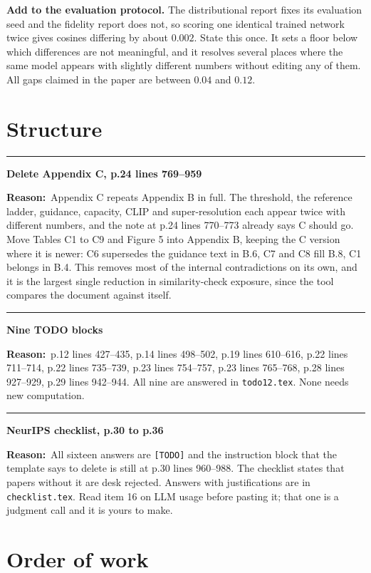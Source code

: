 \documentclass[11pt]{article}
\newcommand{\NEW}[1]{\medskip\noindent\textcolor{hd}{\rule{\textwidth}{0.6pt}}\par
  \noindent\textbf{#1}\par\smallskip}
\newcommand{\NOTE}[1]{\noindent\textbf{Reason:}\ #1\par}
\begin{document}
\textbf{Add to the evaluation protocol.} The distributional report fixes its evaluation seed and
the fidelity report does not, so scoring one identical trained network twice gives cosines
differing by about $0.002$. State this once. It sets a floor below which differences are not
meaningful, and it resolves several places where the same model appears with slightly different
numbers without editing any of them. All gaps claimed in the paper are between $0.04$ and $0.12$.

\section{Structure}

\NEW{Delete Appendix C, p.24 lines 769--959}
\NOTE{Appendix C repeats Appendix B in full. The threshold, the reference ladder, guidance,
capacity, CLIP and super-resolution each appear twice with different numbers, and the note at
p.24 lines 770--773 already says C should go. Move Tables C1 to C9 and Figure 5 into Appendix B,
keeping the C version where it is newer: C6 supersedes the guidance text in B.6, C7 and C8 fill
B.8, C1 belongs in B.4. This removes most of the internal contradictions on its own, and it is
the largest single reduction in similarity-check exposure, since the tool compares the document
against itself.}

\NEW{Nine TODO blocks}
\NOTE{p.12 lines 427--435, p.14 lines 498--502, p.19 lines 610--616, p.22 lines 711--714, p.22
lines 735--739, p.23 lines 754--757, p.23 lines 765--768, p.28 lines 927--929, p.29 lines
942--944. All nine are answered in \texttt{todo12.tex}. None needs new computation.}

\NEW{NeurIPS checklist, p.30 to p.36}
\NOTE{All sixteen answers are \texttt{[TODO]} and the instruction block that the template says to
delete is still at p.30 lines 960--988. The checklist states that papers without it are desk
rejected. Answers with justifications are in \texttt{checklist.tex}. Read item 16 on LLM usage
before pasting it; that one is a judgment call and it is yours to make.}

\section{Order of work}
\end{document}
